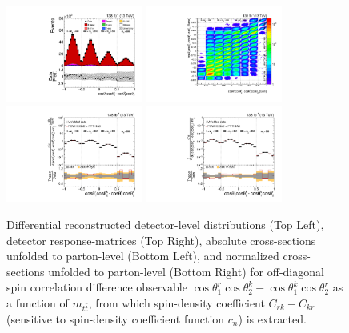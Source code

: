\clearpage
\begin{figure}[htb]
\begin{center}
 \includegraphics[width=0.40\textwidth]{fig_fullRun2UL/controlplots/combined/Hyp_LLBarCMrk_vs_TTBarMass.pdf}
 \includegraphics[width=0.40\textwidth]{fig_fullRun2UL/unfolding/combined/ResponseMatrix_c_Mrk_mttbar.pdf} \\
 \includegraphics[width=0.40\textwidth]{fig_fullRun2UL/unfolding/combined/UnfoldedResults_c_Mrk_mttbar.pdf}
 \includegraphics[width=0.40\textwidth]{fig_fullRun2UL/unfolding/combined/UnfoldedResultsNorm_c_Mrk_mttbar.pdf} \\
\label{fig:c_Mrk_mttbar}
\caption{Differential reconstructed detector-level distributions (Top Left), detector response-matrices (Top Right), absolute cross-sections unfolded to parton-level (Bottom Left), and normalized cross-sections unfolded to parton-level (Bottom Right) for off-diagonal spin correlation difference observable $\cos\theta_{1}^{r}\cos\theta_{2}^{k}-\cos\theta_{1}^{k}\cos\theta_{2}^{r}$ as a function of $m_{t\bar{t}}$, from which spin-density coefficient $C_{rk}-C_{kr}$ (sensitive to spin-density coefficient function $c_n$) is extracted.}
\end{center}
\end{figure}

